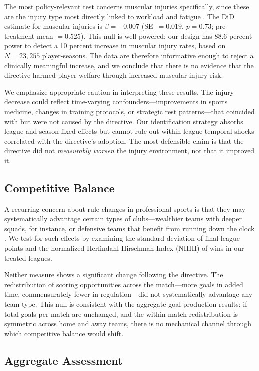 The most policy-relevant test concerns muscular injuries specifically,
since these are the injury type most directly linked to workload and
fatigue \citep{Ekstrand2016}. The DiD estimate for muscular injuries is
$\beta = -0.007$ (SE~$= 0.019$, $p = 0.73$; pre-treatment mean $=
0.525$). This null is well-powered: our design has 88.6 percent power to
detect a 10 percent increase in muscular injury rates, based on
$N = 23{,}255$ player-seasons. The data are therefore informative enough
to reject a clinically meaningful increase, and we conclude that there is
no evidence that the directive harmed player welfare through increased
muscular injury risk.

We emphasize appropriate caution in interpreting these results. The injury
decrease could reflect time-varying confounders---improvements in sports
medicine, changes in training protocols, or strategic rest
patterns---that coincided with but were not caused by the directive.
Our identification strategy absorbs league and season fixed effects but
cannot rule out within-league temporal shocks correlated with the
directive's adoption. The most defensible claim is that the directive did
not \emph{measurably worsen} the injury environment, not that it improved
it.

\subsection{Competitive Balance}\label{subsec:balance}

A recurring concern about rule changes in professional sports is that
they may systematically advantage certain types of clubs---wealthier teams
with deeper squads, for instance, or defensive teams that benefit from
running down the clock \citep{Fort2007}. We test for such effects by
examining the standard deviation of final league points and the normalized
Herfindahl-Hirschman Index (NHHI) of wins in our treated leagues.

Neither measure shows a significant change following the directive. The
redistribution of scoring opportunities across the match---more goals in
added time, commensurately fewer in regulation---did not systematically
advantage any team type. This null is consistent with the aggregate
goal-production results: if total goals per match are unchanged, and the
within-match redistribution is symmetric across home and away teams, there
is no mechanical channel through which competitive balance would shift.

\subsection{Aggregate Assessment}

